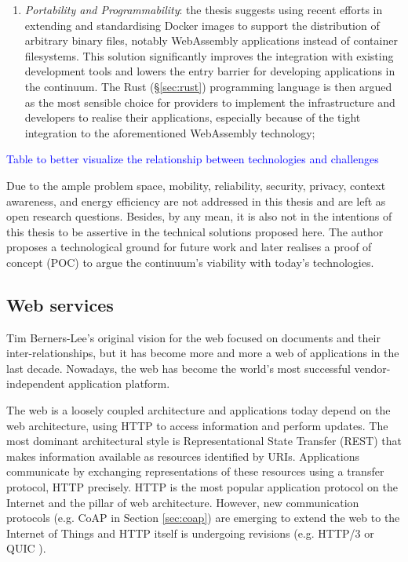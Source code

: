\begin{enumerate}
    \item \emph{Portability and Programmability}: the thesis suggests using recent efforts in extending and standardising Docker images to support the distribution of arbitrary binary files, notably WebAssembly applications instead of container filesystems. This solution significantly improves the integration with existing development tools and lowers the entry barrier for developing applications in the continuum. The Rust (§\ref{sec:rust}) programming language is then argued as the most sensible choice for providers to implement the infrastructure and developers to realise their applications, especially because of the tight integration to the aforementioned WebAssembly technology;
\end{enumerate}

\textcolor{blue}{Table to better visualize the relationship between technologies and challenges}

Due to the ample problem space, mobility, reliability, security, privacy, context awareness, and energy efficiency are not addressed in this thesis and are left as open research questions. Besides, by any mean, it is also not in the intentions of this thesis to be assertive in the technical solutions proposed here. The author proposes a technological ground for future work and later realises a proof of concept (POC) to argue the continuum's viability with today's technologies.

\subsection{Web services}
\label{sec:web}

Tim Berners-Lee's original vision for the web focused on documents and their inter-relationships, but it has become more and more a web of applications in the last decade. Nowadays, the web has become the world's most successful vendor-independent application platform.

The web is a loosely coupled architecture and applications today depend on the web architecture, using HTTP to access information and perform updates. The most dominant architectural style is Representational State Transfer (REST) \cite{rest} that makes information available as resources identified by URIs. Applications communicate by exchanging representations of these resources using a transfer protocol, HTTP precisely. HTTP is the most popular application protocol on the Internet and the pillar of web architecture. However, new communication protocols (e.g. CoAP in Section \ref{sec:coap}) are emerging to extend the web to the Internet of Things and HTTP itself is undergoing revisions (e.g. HTTP/3 or QUIC \cite{quic}).

